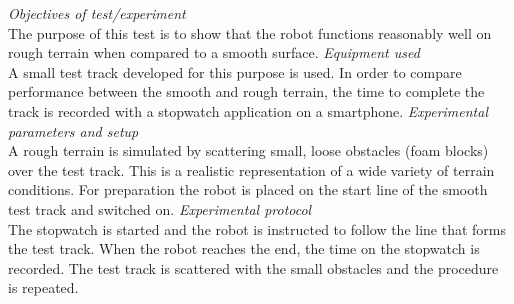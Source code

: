 \textit{Objectives of test/experiment}\\The purpose of this test is to show that the robot functions reasonably well on rough terrain when compared to a smooth surface.
\textit{Equipment used}\\
A small test track developed for this purpose is used. In order to compare performance between the smooth and rough terrain, the time to complete the track is recorded with a stopwatch application on a smartphone.
\textit{Experimental parameters and setup }\\
A rough terrain is simulated by scattering small, loose obstacles (foam blocks) over the test track. This is a realistic representation of a wide variety of terrain conditions. For preparation the robot is placed on the start line of the smooth test track and switched on. 
\textit{Experimental protocol}\\
The stopwatch is started and the robot is instructed to follow the line that forms the test track. When the robot reaches the end, the time on the stopwatch is recorded. The test track is scattered with the small obstacles and the procedure is repeated.
